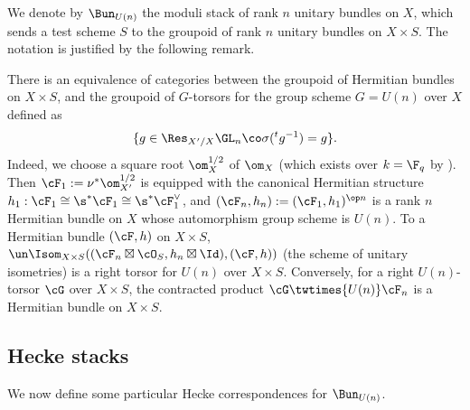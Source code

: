 We denote by $\Bun_{U(n)}$  the moduli stack of rank $n$ unitary bundles on $X$, which sends a test scheme $S$ to the groupoid of rank $n$ unitary bundles on $X \times S$.  The notation is justified by the following remark.

\begin{remark}
\notready\label{r:Un} There is an equivalence of categories between the groupoid of Hermitian bundles on $X \times S$, and the groupoid of $G$-torsors for the group scheme $G = U(n)$ over $X$ defined as %
\[
\{ g \in \Res_{X'/X}\GL_n \co \sigma({}^tg^{-1}) = g \}.
\]
Indeed, we choose a square root $\om^{1/2}_{X}$ of $\om_{X}$ (which exists over $k = \F_{q}$ by \cite[p.291, Theorem 13]{Weil}). Then $\cF_{1}:=\nu^{*}\om^{1/2}_{X'}$ is equipped with the canonical Hermitian structure $h_{1}: \cF_{1}\cong \s^{*}\cF_{1}\cong  \s^{*}\cF^{\vee}_{1}$, and $(\cF_{n},h_{n}):=(\cF_{1},h_{1})^{\op n}$ is a rank $n$ Hermitian bundle on $X$ whose automorphism group scheme is $U(n)$.  To a Hermitian bundle $(\cF,h)$ on $X \times S$, $\un\Isom_{X\times S}((\cF_{n}\boxtimes\cO_{S},h_{n}\boxtimes\Id), (\cF,h))$ (the scheme of unitary isometries)   is a right torsor for $U(n)$ over $X\times S$. Conversely, for a right $U(n)$-torsor $\cG$ over $X\times S$, the contracted product $\cG\twtimes{U(n)}\cF_{n}$ is a Hermitian bundle on $X \times S$.
\end{remark}


\subsection{Hecke stacks} We now define some particular Hecke correspondences for $\Bun_{U(n)}$.

